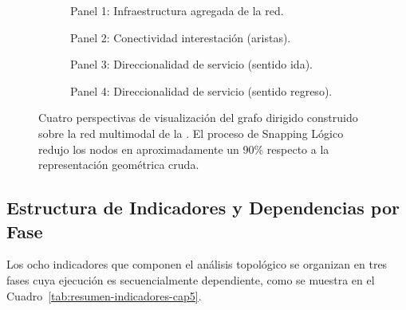 \begin{figure}[H]
    \centering
    \begin{subfigure}[b]{0.48\textwidth}
        \centering
        \caption{Panel 1: Infraestructura agregada de la red.}
        \label{fig:panel1}
    \end{subfigure}
    \hfill
    \begin{subfigure}[b]{0.48\textwidth}
        \centering
        \caption{Panel 2: Conectividad interestación (aristas).}
        \label{fig:panel2}
    \end{subfigure}

    \vspace{0.5em}

    \begin{subfigure}[b]{0.48\textwidth}
        \centering
        \caption{Panel 3: Direccionalidad de servicio (sentido ida).}
        \label{fig:panel3}
    \end{subfigure}
    \hfill
    \begin{subfigure}[b]{0.48\textwidth}
        \centering
        \caption{Panel 4: Direccionalidad de servicio (sentido regreso).}
        \label{fig:panel4}
    \end{subfigure}
    \caption[Visualización del grafo topológico de la \zmvm]{Cuatro perspectivas
    de visualización del grafo dirigido construido sobre la red multimodal de la
    \zmvm. El proceso de Snapping Lógico redujo los nodos en aproximadamente
    un 90\% respecto a la representación geométrica cruda.}
    \label{fig:paneles-grafo}
\end{figure}

\subsection{Estructura de Indicadores y Dependencias por Fase}
\label{subsec:tabla-indicadores}

Los ocho indicadores que componen el análisis topológico se organizan en tres
fases cuya ejecución es secuencialmente dependiente, como se muestra en el
Cuadro~\ref{tab:resumen-indicadores-cap5}.

